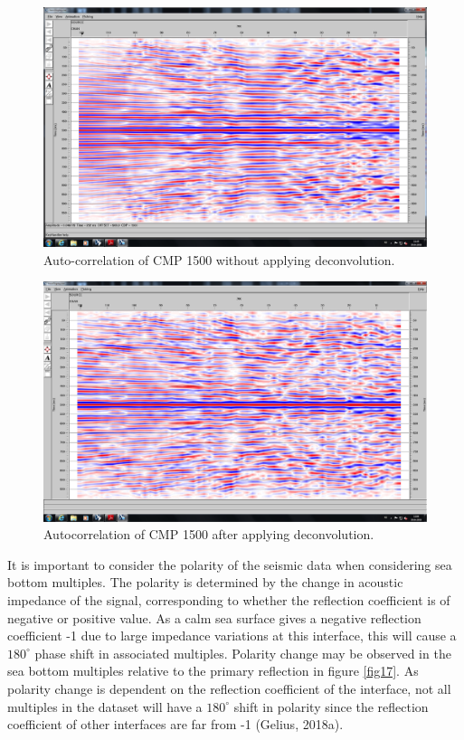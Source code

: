 \documentclass[10pt,a4paper]{article}
\begin{document}
\begin{figure}[H]
\centering
\includegraphics[width=\textwidth, trim={2cm 4cm 1cm 2cm},clip]{fig15.jpg}
\caption{Auto-correlation of CMP 1500 without applying deconvolution.}
\label{fig15}
\end{figure}

\begin{figure}[H]
\includegraphics[width=\textwidth, trim={2cm 4cm 1cm 2cm},clip]{fig16.jpg}
\caption{Autocorrelation of CMP 1500 after applying deconvolution.}
\label{fig16}
\end{figure}

\noindent It is important to consider the polarity of the seismic data when considering sea bottom multiples. The polarity is determined by the change in acoustic impedance of the signal, corresponding to whether the reflection coefficient is of negative or positive value. As a calm sea surface gives a negative reflection coefficient -1 due to large impedance variations at this interface, this will cause a $180^{\circ}$ phase shift in associated multiples. Polarity change may be observed in the sea bottom multiples relative to the primary reflection in figure \ref{fig17}. As polarity change is dependent on the reflection coefficient of the interface, not all multiples in the dataset will have a $180^{\circ}$ shift in polarity since the reflection coefficient of other interfaces are far from -1 (Gelius, 2018a).
\end{document}
